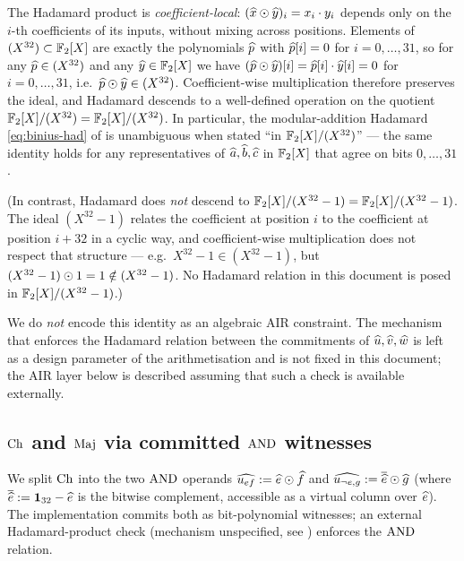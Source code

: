 \begin{remark}\label{rem:had-descent}
The Hadamard product is \emph{coefficient-local}:
$(\widehat{x} \odot \widehat{y})_i = x_i \cdot y_i$ depends only on the $i$-th
coefficients of its inputs, without mixing across positions.
Elements of $(X^{32}) \subset \mathbb{F}_2[X]$ are exactly the polynomials
$\widehat{p}$ with $\widehat{p}[i] = 0$ for $i = 0, \dots, 31$, so for any
$\widehat{p} \in (X^{32})$ and any $\widehat{y} \in \mathbb{F}_2[X]$ we have
$(\widehat{p} \odot \widehat{y})[i] = \widehat{p}[i] \cdot \widehat{y}[i] = 0$ for $i =
0, \dots, 31$, i.e.\ $\widehat{p} \odot \widehat{y} \in (X^{32})$. Coefficient-wise
multiplication therefore preserves the ideal, and Hadamard descends
to a well-defined operation on the quotient
$\mathbb{F}_2[X]/(X^{32}) = \mathbb{F}_2[X]/(X^{32})$. In particular, the modular-addition
Hadamard \eqref{eq:binius-had} of  is unambiguous
when stated ``in $\mathbb{F}_2[X]/(X^{32})$'' --- the same identity holds for any
representatives of $\widehat{a}, \widehat{b}, \widehat{c}$ in $\mathbb{F}_2[X]$ that agree
on bits $0, \dots, 31$.

(In contrast, Hadamard does \emph{not} descend to $\mathbb{F}_2[X]/(X^{32}-1) =
\mathbb{F}_2[X]/(X^{32}-1)$. The ideal $(X^{32}-1)$ relates the
coefficient at position $i$ to the coefficient at position $i + 32$
in a cyclic way, and coefficient-wise multiplication does not respect
that structure --- e.g.\ $X^{32} - 1 \in (X^{32}-1)$, but
$(X^{32}-1) \odot 1 = 1 \notin (X^{32}-1)$. No Hadamard relation in
this document is posed in $\mathbb{F}_2[X]/(X^{32}-1)$.)
\end{remark}

We do \emph{not} encode this identity as an algebraic AIR constraint.
The mechanism that enforces the Hadamard relation between the
commitments of $\widehat{u}, \widehat{v}, \widehat{w}$ is left as a design parameter
of the arithmetisation and is not fixed in this document; the AIR
layer below is described assuming that such a check is available
externally.

\subsection{$\operatorname{Ch}$ and $\operatorname{Maj}$ via committed $\operatorname{AND}$ witnesses}\label{sec:ch-maj}

We split $\operatorname{Ch}$ into the two $\operatorname{AND}$ operands
$\widehat{u_{ef}} := \widehat{e}\odot \widehat{f}$ and
$\widehat{u_{\neg e, g}} := \overline{\widehat{e}}\odot \widehat{g}$ (where
$\overline{\widehat{e}} := \mathbf{1}_{32} - \widehat{e}$ is the bitwise
complement, accessible as a virtual column over $\widehat{e}$). The
implementation commits both as bit-polynomial witnesses; an external
Hadamard-product check (mechanism unspecified, see
) enforces the $\operatorname{AND}$ relation.

